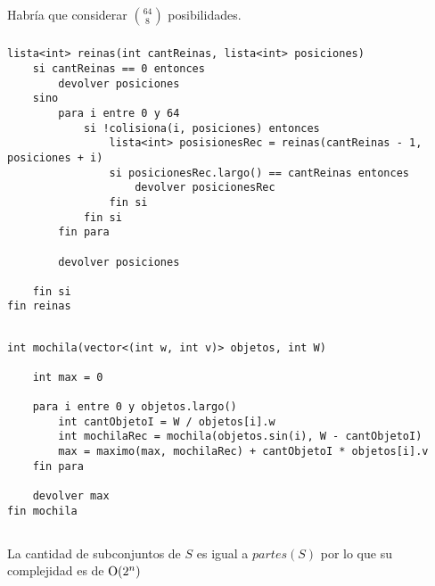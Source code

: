\setcounter{subsection}{12}
\subsection{}

\subsubsection{}
Habría que considerar $64 \choose 8$ posibilidades.

\subsubsection{}

\begin{codesnippet}
\begin{verbatim}
lista<int> reinas(int cantReinas, lista<int> posiciones)
    si cantReinas == 0 entonces
        devolver posiciones
    sino
        para i entre 0 y 64
            si !colisiona(i, posiciones) entonces
                lista<int> posisionesRec = reinas(cantReinas - 1, posiciones + i)
                si posicionesRec.largo() == cantReinas entonces
                    devolver posicionesRec
                fin si
            fin si
        fin para

        devolver posiciones

    fin si
fin reinas
\end{verbatim}
\end{codesnippet}

\subsection{}

\begin{codesnippet}
\begin{verbatim}
int mochila(vector<(int w, int v)> objetos, int W)

    int max = 0

    para i entre 0 y objetos.largo()
        int cantObjetoI = W / objetos[i].w
        int mochilaRec = mochila(objetos.sin(i), W - cantObjetoI)
        max = maximo(max, mochilaRec) + cantObjetoI * objetos[i].v
    fin para

    devolver max
fin mochila
\end{verbatim}
\end{codesnippet}

\subsection{}

\setcounter{subsubsection}{1}
\subsubsection{}
La cantidad de subconjuntos de $S$ es igual a $partes(S)$ por lo que su complejidad es de $\operatorname{O}(2^n)$